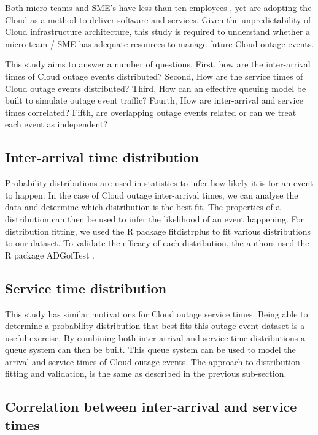 \documentclass[5p]{elsarticle}
\begin{document}
Both micro teams and SME's have less than ten employees \cite{eusmereport2015}, yet are adopting the Cloud as a method to deliver software and services. Given the unpredictability of Cloud infrastructure architecture, this study is required to understand whether a micro team / SME has adequate resources to manage future Cloud outage events. 

This study aims to answer a number of questions. First, how are the inter-arrival times of Cloud outage events distributed? Second, How are the service times of Cloud outage events distributed?  Third, How can an effective queuing model be built to simulate outage event traffic? Fourth, How are inter-arrival and service times correlated? Fifth, are overlapping outage events related or can we treat each event as independent? 

\subsection{Inter-arrival time distribution}

Probability distributions are used in statistics to infer how likely it is for an event to happen. In the case of Cloud outage inter-arrival times,  we can analyse the data and determine which distribution is the best fit. The properties of a distribution can then be used to infer the likelihood of an event happening. For distribution fitting, we used the R package fitdistrplus \cite{fitdistrplus} to fit various distributions to our dataset. To validate the efficacy of each distribution,  the authors used the R package ADGofTest \cite{ADGoF}. 

\subsection{Service time distribution}

This study has similar motivations for Cloud outage service times. Being able to determine a probability distribution that best fits this outage event dataset is a useful exercise. By combining both inter-arrival and service time distributions a queue system can then be built. This queue system can be used to model the arrival and service times of Cloud outage events. The approach to distribution fitting and validation, is the same as described in the previous sub-section. 

\subsection{Correlation between inter-arrival and service times}
\end{document}
